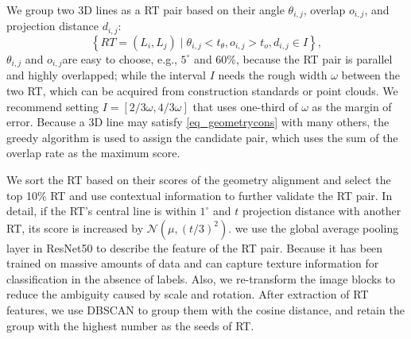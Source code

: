 We group two 3D lines as a RT pair based on their angle $\theta_{i,j}$,
overlap $o_{i,j}$,
and projection distance $d_{i,j}$:
\begin{equation}
   \left\{ RT= \left(L_i, L_j\right) \mid \theta_{i,j} < t_\theta, o_{i,j} > t_o, d_{i,j} \in I  \right\},
    \label{eq_geometrycons}
\end{equation}
$\theta_{i,j}$ and $o_{i,j}$are easy to choose,
e.g.,
$5^\circ$ and 60\%,
because the RT pair is parallel and highly overlapped;
while the interval $I$ needs the rough width $\omega$ between the two RT,
which can be acquired from construction standards or point clouds.
We recommend setting $I=\left[2/3\omega,4/3\omega\right]$ that uses one-third of $\omega$ as the margin of error.
Because a 3D line may satisfy \cref{eq_geometrycons} with many others,
the greedy algorithm is used to assign the candidate pair,
which uses the sum of the overlap rate as the maximum score.

We sort the RT based on their scores of the geometry alignment and select the top 10\% RT and use contextual information to further validate the RT pair.
In detail,
if the RT's central line is within $1^\circ$ and $t$ projection distance with another RT,
its score is increased by $\mathcal{N}\left(\mu, \left(t/3\right)^2\right)$.
we use the global average pooling layer in ResNet50 to describe the feature of the RT pair.
Because it has been trained on massive amounts of data and can capture texture information for classification in the absence of labels.
Also, 
we re-transform the image blocks to reduce the ambiguity caused by scale and rotation.
After extraction of RT features, 
we use DBSCAN to group them with the cosine distance,
and retain the group with the highest number as the seeds of RT.












